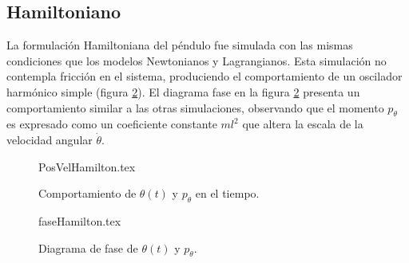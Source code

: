 \subsection{Hamiltoniano}

La formulación Hamiltoniana del péndulo fue simulada con las mismas 
condiciones que los modelos Newtonianos y Lagrangianos.
Esta simulación no contempla fricción en el sistema, produciendo
el comportamiento de un oscilador harmónico simple 
(figura \ref{fig: phase plot theta hamiltonian}).
El diagrama fase en la figura \ref{fig: phase plot theta hamiltonian}
presenta un comportamiento similar a las otras simulaciones, observando
que el momento $p_{\theta}$ es expresado como un coeficiente constante
$m l ^2$ que altera la escala de la velocidad angular $\dot \theta$.


\begin{figure}[htb!]
 \centering 
 {PosVelHamilton.tex}
 \caption{Comportamiento de $\theta(t)$ y $p_{\theta}$ en el tiempo.}
 \label{fig: time plot theta ptheta hamiltonian}
\end{figure}

\begin{figure}[htb!]
 \centering 
 {faseHamilton.tex}
\caption{Diagrama de fase de $\theta(t)$ y $p_{\theta}$.}
 \label{fig: phase plot theta hamiltonian}
\end{figure}
